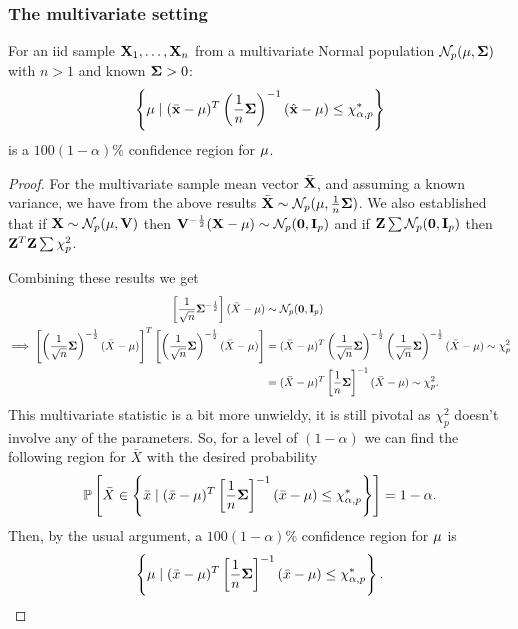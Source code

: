 \documentclass[10pt, a4paper]{article}
\begin{document}
\subsubsection{The multivariate setting}

\begin{proposition}
    For an iid sample $\mathbf{X}_1, \dotsc, \mathbf{X}_n$ from a multivariate Normal population $\mathcal{N}_p(\mathbf{\mu}, \mathbf{\Sigma})$ with $n > 1$ and known $\mathbf{\Sigma} > 0$:
    \[
    \left\{\mathbf{\mu}\mid (\bar{\mathbf{x}} - \mathbf{\mu}) ^ T\left(\frac{1}{n}\mathbf{\Sigma}\right) ^ {-1}(\hat{\mathbf{x}} - \mathbf{\mu}) \leq \chi_{\alpha, p}^{*}\right\}
    \]
    is a $100(1 - \alpha)\%$ confidence region for $\mathbf{\mu}$.

    \begin{proof}
        For the multivariate sample mean vector $\bar{\mathbf{X}}$,
        and assuming a known variance,
        we have from the above results $\bar{\mathbf{X}} \sim \mathcal{N}_p(\mathbf{\mu}, \frac{1}{n}\mathbf{\Sigma})$.
        We also established that if $\mathbf{X} \sim \mathcal{N}_p(\mathbf{\mu}, \mathbf{V})$ then $\mathbf{V} ^ {-\frac{1}{2}}(\mathbf{X} - \mathbf{\mu}) \sim \mathcal{N}_p(\mathbf{0}, \mathbf{I}_p)$ and if $\mathbf{Z} \sum \mathcal{N}_p(\mathbf{0}, \mathbf{I}_p)$ then $\mathbf{Z} ^ T\mathbf{Z} \sum \chi_{p}^{2}$.

        Combining these results we get
        \begin{align*}
            \left[\frac{1}{\sqrt{n}}\mathbf{\Sigma} ^ {-\frac{1}{2}}\right](\bar{X} - \mathbf{\mu}) &\sim \mathcal{N}_p(\mathbf{0}, \mathbf{I}_p) \\
            \implies \left[\left(\frac{1}{\sqrt{n}}\mathbf{\Sigma}\right) ^ {-\frac{1}{2}}(\bar{X} - \mathbf{\mu})\right] ^ T\left[\left(\frac{1}{\sqrt{n}}\mathbf{\Sigma}\right) ^ {-\frac{1}{2}}(\bar{X} - \mathbf{\mu})\right] &= (\bar{X} - \mathbf{\mu}) ^ T\left(\frac{1}{\sqrt{n}}\mathbf{\Sigma}\right) ^ {-\frac{1}{2}}\left(\frac{1}{\sqrt{n}}\mathbf{\Sigma}\right) ^ {-\frac{1}{2}}(\bar{X} - \mathbf{\mu}) \sim \chi_{p}^{2} \\
            &= (\bar{X} - \mathbf{\mu}) ^ T\left[\frac{1}{n}\mathbf{\Sigma}\right] ^ {-1}(\bar{X} - \mathbf{\mu}) \sim \chi_{p}^{2}.
        \end{align*}
        This multivariate statistic is a bit more unwieldy,
        it is still pivotal as $\chi_{p}^{2}$ doesn't involve any of the parameters.
        So,
        for a level of $(1 - \alpha)$ we can find the following region for $\bar{X}$ with the desired probability
        \[
        \mathbb{P}\left[\bar{X} \in \left\{\bar{x}\mid (\bar{x} - \mathbf{\mu}) ^ T\left[\frac{1}{n}\mathbf{\Sigma}\right] ^ {-1}(\bar{x} - \mathbf{\mu}) \leq \chi_{\alpha, p}^{*}\right\}\right] = 1 - \alpha.
        \]
        Then,
        by the usual argument,
        a $100(1 - \alpha)\%$ confidence region for $\mathbf{\mu}$ is
        \[
        \left\{\mathbf{\mu} \mid (\bar{x} - \mathbf{\mu}) ^ T\left[\frac{1}{n}\mathbf{\Sigma}\right] ^ {-1}(\bar{x} - \mathbf{\mu}) \leq \chi_{\alpha, p}^{*}\right\}.
        \]
    \end{proof}
\end{proposition}
\end{document}
